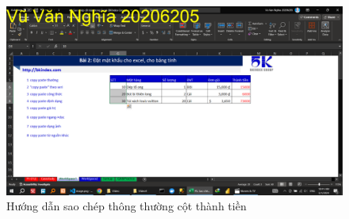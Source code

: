 \documentclass{article}
\begin{document}






\begin{figure}[H]
\centering
\includegraphics[scale = 0.15]{Video4/HuongDan/1.png}
\caption{Hướng dẫn sao chép thông thường cột thành tiền}
\end{figure}
\end{document}
